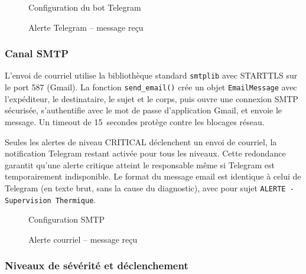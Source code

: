 \begin{figure}[htbp]
  \centering
  \caption{Configuration du bot Telegram}
  \label{fig:telegram_bot}
\end{figure}

\begin{figure}[htbp]
  \centering
  \caption{Alerte Telegram -- message reçu}
  \label{fig:telegram_alert}
\end{figure}

\subsubsection{Canal SMTP}

L'envoi de courriel utilise la bibliothèque standard \texttt{smtplib} avec STARTTLS sur le port 587 (Gmail). La fonction \texttt{send\_email()} crée un objet \texttt{EmailMessage} avec l'expéditeur, le destinataire, le sujet et le corps, puis ouvre une connexion SMTP sécurisée, s'authentifie avec le mot de passe d'application Gmail, et envoie le message. Un timeout de 15~secondes protège contre les blocages réseau.

Seules les alertes de niveau CRITICAL déclenchent un envoi de courriel, la notification Telegram restant activée pour tous les niveaux. Cette redondance garantit qu'une alerte critique atteint le responsable même si Telegram est temporairement indisponible. Le format du message email est identique à celui de Telegram (en texte brut, sans la cause du diagnostic), avec pour sujet \texttt{ALERTE - Supervision Thermique}.

\begin{figure}[htbp]
  \centering
  \caption{Configuration SMTP}
  \label{fig:smtp_config}
\end{figure}

\begin{figure}[htbp]
  \centering
  \caption{Alerte courriel -- message reçu}
  \label{fig:email_alert}
\end{figure}

\subsubsection{Niveaux de sévérité et déclenchement}

